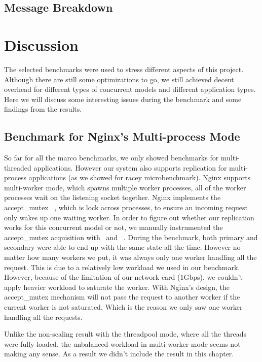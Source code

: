 \subsection{Message Breakdown}

\section{Discussion}
The selected benchmarks were used to stress different aspects of this project. Although there are still some optimizations to go, we still achieved decent overhead for different types of concurrent models and different application types. Here we will discuss some interesting issues during the benchmark and some findings from the results.

\subsection{Benchmark for Nginx's Multi-process Mode}
So far for all the marco benchmarks, we only showed benchmarks for multi-threaded applications. However our system also supports replication for multi-process applications (as we showed for racey microbenchmark). Nginx supports multi-worker mode, which spawns multiple worker processes, all of the worker processes wait on the listening socket together. Nginx implements the accept\_mutex ~\cite{nginxscalability}, which is lock across processes, to ensure an incoming request only wakes up one waiting worker. In order to figure out whether our replication works for this concurrent model or not, we manually instrumented the accept\_mutex acquisition with \detstart\ and \detend\ . During the benchmark, both primary and secondary were able to end up with the same state all the time. However no matter how many workers we put, it was always only one worker handling all the request. This is due to a relatively low workload we used in our benchmark. However, because of the limitation of our network card (1Gbps), we couldn't apply heavier workload to saturate the worker. With Nginx's design, the accept\_mutex mechanism will not pass the request to another worker if the current worker is not saturated. Which is the reason we only saw one worker handling all the requests.

Unlike the non-scaling result with the threadpool mode, where all the threads were fully loaded, the unbalanced workload in multi-worker mode seems not making any sense. As a result we didn't include the result in this chapter.


